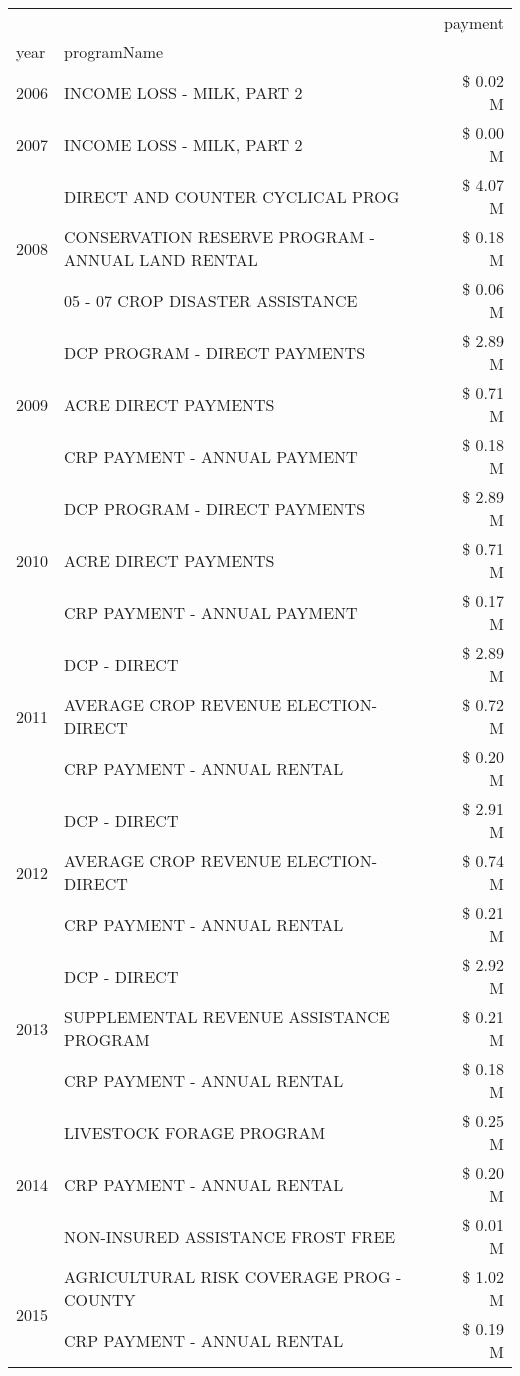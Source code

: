 \begin{tabular}{llr}
\toprule
 &  & payment \\
year & programName &  \\
\midrule
2006 & INCOME LOSS - MILK, PART 2 & \$ 0.02 M \\
\cline{1-3}
2007 & INCOME LOSS - MILK, PART 2 & \$ 0.00 M \\
\cline{1-3}
\multirow[t]{3}{*}{2008} & DIRECT AND COUNTER CYCLICAL PROG & \$ 4.07 M \\
 & CONSERVATION RESERVE PROGRAM - ANNUAL LAND RENTAL & \$ 0.18 M \\
 & 05 - 07 CROP DISASTER ASSISTANCE & \$ 0.06 M \\
\cline{1-3}
\multirow[t]{3}{*}{2009} & DCP PROGRAM - DIRECT PAYMENTS & \$ 2.89 M \\
 & ACRE DIRECT PAYMENTS & \$ 0.71 M \\
 & CRP PAYMENT - ANNUAL PAYMENT & \$ 0.18 M \\
\cline{1-3}
\multirow[t]{3}{*}{2010} & DCP PROGRAM - DIRECT PAYMENTS & \$ 2.89 M \\
 & ACRE DIRECT PAYMENTS & \$ 0.71 M \\
 & CRP PAYMENT - ANNUAL PAYMENT & \$ 0.17 M \\
\cline{1-3}
\multirow[t]{3}{*}{2011} & DCP - DIRECT & \$ 2.89 M \\
 & AVERAGE CROP REVENUE ELECTION-DIRECT & \$ 0.72 M \\
 & CRP PAYMENT - ANNUAL RENTAL & \$ 0.20 M \\
\cline{1-3}
\multirow[t]{3}{*}{2012} & DCP - DIRECT & \$ 2.91 M \\
 & AVERAGE CROP REVENUE ELECTION-DIRECT & \$ 0.74 M \\
 & CRP PAYMENT - ANNUAL RENTAL & \$ 0.21 M \\
\cline{1-3}
\multirow[t]{3}{*}{2013} & DCP - DIRECT & \$ 2.92 M \\
 & SUPPLEMENTAL REVENUE ASSISTANCE PROGRAM & \$ 0.21 M \\
 & CRP PAYMENT - ANNUAL RENTAL & \$ 0.18 M \\
\cline{1-3}
\multirow[t]{3}{*}{2014} & LIVESTOCK FORAGE PROGRAM & \$ 0.25 M \\
 & CRP PAYMENT - ANNUAL RENTAL & \$ 0.20 M \\
 & NON-INSURED ASSISTANCE FROST FREE & \$ 0.01 M \\
\cline{1-3}
\multirow[t]{3}{*}{2015} & AGRICULTURAL RISK COVERAGE PROG - COUNTY & \$ 1.02 M \\
 & CRP PAYMENT - ANNUAL RENTAL & \$ 0.19 M \\

\end{tabular}
